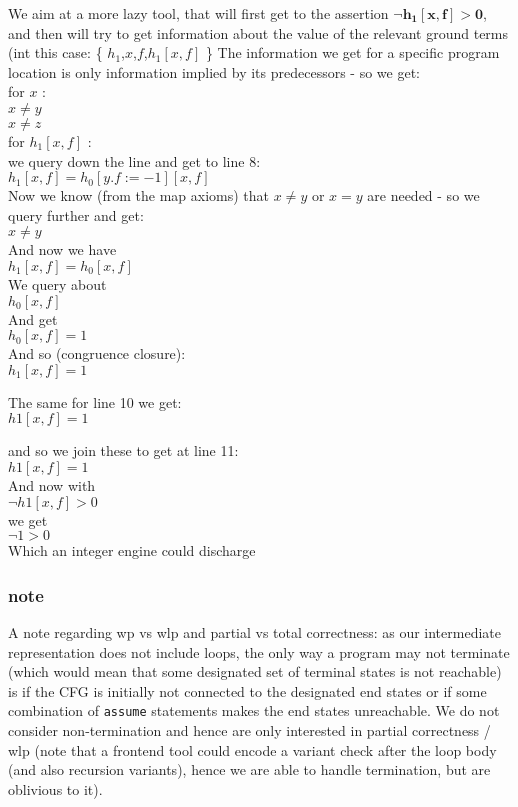 We aim at a more lazy tool, that will first get to the assertion $\mathbf{\lnot h_1[x,f] > 0}$, and then will try to get information about the value of the relevant ground terms (int this case: \{ $h_1$,$x$,$f$,$h_1[x,f]$ \}
The information we get for a specific program location is only information implied by its predecessors - so we get: \\
	for $x$ : \\
	$x \neq y $ \\
	$x \neq z $ \\
	for $h_1[x,f]$ : \\
	we query down the line and get to line 8: \\
	$h_1[x,f] = h_0[y.f := -1][x,f]$ \\
	Now we know (from the map axioms) that $x \neq y$ or $x = y$ are needed - so we query further and get: \\
	$x \neq y $ \\
	And now we have \\
	$h_1[x,f] = h_0[x,f]$ \\
	We query about  \\
	$h_0[x,f]$ \\
	And get \\
	$h_0[x,f]=1$ \\
	And so (congruence closure): \\
	$h_1[x,f]=1$
	
	The same for line 10 we get: \\
	$h1[x,f]=1$
	
	and so we join these to get at line 11: \\
	$h1[x,f]=1$ \\
	And now with \\
	$\lnot h1[x,f]>0$ \\
	we get \\
	$\lnot 1>0$ \\ 
	Which an integer engine could discharge 

\subsubsection*{note}
A note regarding wp vs wlp and partial vs total correctness: as our intermediate representation does not include loops, the only way a program may not terminate (which would mean that some designated set of terminal states is not reachable) is if the CFG is initially not connected to the designated end states or if some combination of \lstinline{assume} statements makes the end states unreachable.
We do not consider non-termination and hence are only interested in partial correctness / wlp (note that a frontend tool could encode a variant check after the loop body (and also recursion variants), hence we are able to handle termination, but are oblivious to it).
